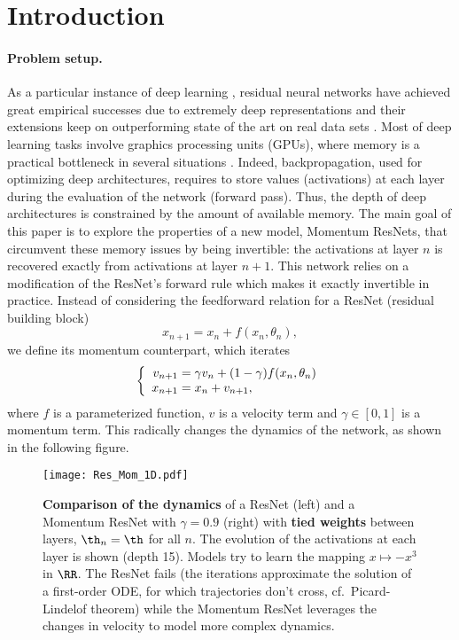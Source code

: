 \documentclass{article}
\begin{document}
\vspace{-1em}
\section{Introduction}
\label{submission}

\paragraph{Problem setup.}

As a particular instance of deep learning \citep{cite-key,Goodfellow-et-al-2016}, residual neural networks \citep[ResNets]{he2015deep} have achieved great empirical successes due to extremely deep representations and their extensions keep on outperforming state of the art on real data sets \citep{alex2019big,touvron2020fixing}.
Most of deep learning tasks involve graphics processing units (GPUs), where memory is a practical bottleneck in several situations \citep{wang2018superneurons,peng2017large,zhu2017unpaired}.
Indeed, backpropagation, used for optimizing deep architectures, requires to store values (activations) at each layer during the evaluation of the network (forward pass). Thus, the depth of deep architectures is constrained by the amount of available memory. The main goal of this paper is to explore the properties of a new model, Momentum ResNets, that circumvent these memory issues by being invertible: the activations at layer $n$ is recovered exactly from activations at layer $n+1$.
This network relies on a modification of the ResNet's forward rule which makes it exactly invertible in practice. 
Instead of considering the feedforward relation for a ResNet (residual building block)
\begin{equation}\label{eq:ResNet}
    x_{n+1} = x_n + f(x_n,\theta_n),
\end{equation}
we define its momentum counterpart, which iterates \begin{equation}\label{eq:Momentum ResNet}
\left\{
\begin{array}{r@{\hspace{1mm}}l}
v_{n+1} & = \gamma v_n + (1-\gamma) f(x_n,\theta_n)\\ 
x_{n+1} & = x_n + v_{n+1}, 
\end{array}
\right.
\end{equation}
where $f$ is a parameterized function, $v$ is a velocity term and $\gamma \in [0, 1]$ is a momentum term. This radically changes the dynamics of the network, as shown in the following figure.
\begin{figure}[H]
\centering
\texttt{[image: Res\_Mom\_1D.pdf]} 
\caption{\textbf{Comparison of the dynamics} of a ResNet (left) and a Momentum ResNet with $\gamma = 0.9$ (right) with \textbf{tied weights} between layers, $\th_n=\th$ for all $n$. The evolution of the activations at each layer is shown (depth 15). Models try to learn the mapping $x \mapsto -x^{3}$ in $\RR$. The ResNet fails (the iterations approximate the solution of a first-order ODE, for which trajectories don’t cross, cf.\ Picard-Lindelof theorem)
while the Momentum ResNet leverages the changes in velocity to model more complex dynamics.}\label{fig:Res_Mom}
\vspace{-1em}
\end{figure}
\end{document}
